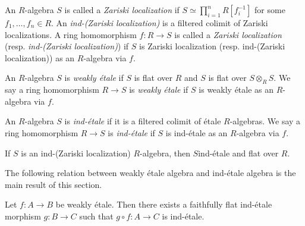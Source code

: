 \begin{definition}
    \label{def:ind-zariski-localization}

    An $R$-algebra $S$ is called a \textit{Zariski localization} if $S \simeq \prod_{i=1}^n R[f_i^{-1}]$ for some $f_1,\dots,f_n \in R$. An \textit{ind-(Zariski localization)} is a filtered colimit of Zariski localizations. A ring homomorphism $f : R \to S$ is called a \textit{Zariski localization} (resp. \emph{ind-(Zariski localization)}) if $S$ is Zariski localization (resp. ind-(Zariski localization)) as an $R$-algebra via $f$.
\end{definition}

\begin{definition}
    An $R$-algebra $S$ is \emph{weakly étale} if $S$ is flat over $R$ and
    $S$ is flat over $S \otimes_{R} S$. We say a ring homomorphism
    $R \to S$ is \emph{weakly étale} if $S$ is weakly étale as an $R$-algebra via $f$.
    \label{def:weakly-etale-algebra}
\end{definition}

\begin{definition}
    An $R$-algebra $S$ is \emph{ind-étale} if it is a filtered colimit of étale $R$-algebras.
    We say a ring homomorphism $R \to S$ is \emph{ind-étale} if $S$ is ind-étale as an $R$-algebra via $f$.
    \label{def:ind-etale-algebra}
\end{definition}

\begin{lemma}
    \label{lem:ind-etale-flat-of-ind-Zariski}

    If \(S\) is an ind-(Zariski localization) \(R\)-algebra, then \(S\)ind-étale and flat over \(R\).
\end{lemma}

The following relation between weakly étale algebra and ind-étale algebra is the main result of this section.
\begin{theorem}
Let $f: A \to B$ be weakly étale. Then there exists a faithfully flat ind-étale morphism $g: B \to C$ such that $g \circ f: A \to C$ is ind-étale.
    \label{thm:weakly-etale-ind-etale}
\end{theorem}


